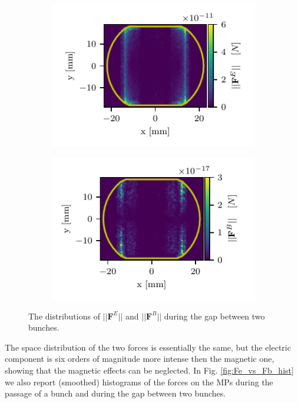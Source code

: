 \begin{figure}
    \centering
    \begin{subfigure}{0.47\textwidth}
        \hspace*{-2cm}
        \includegraphics[scale=1.4]{chapters/Chapter1/Figures/Fe_Pass00028_00000.pdf}
    \end{subfigure}
    \hfill
    \begin{subfigure}{0.47\textwidth}
        \includegraphics[scale=1.4]{chapters/Chapter1/Figures/Fb_Pass00028_00000.pdf}
    \end{subfigure}
    \caption{The distributions of $||\mathbf{F}^E||$ and $||\mathbf{F}^B||$ during the gap between two bunches.}
    \label{fig:Fe_vs_Fb_snap}
\end{figure}
The space distribution of the two forces is essentially the same, but the electric component is six orders of magnitude more intense then the magnetic one, showing that the magnetic effects can be neglected. In Fig. \ref{fig:Fe_vs_Fb_hist} we also report (smoothed) histograms of the forces on the MPs during the passage of a bunch and during the gap between two bunches.
